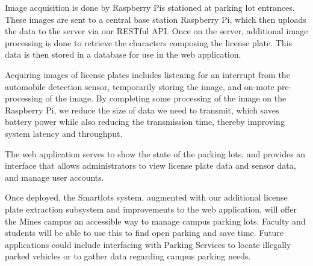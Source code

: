 \documentclass[11pt, oneside, fullpage, doublespace]{article}
\begin{document}
Image acquisition is done by Raspberry Pis stationed at parking lot entrances. These images are sent to a central base station Raspberry Pi, which then uploads the data to the server via our RESTful API. Once on the server, additional image processing is done to retrieve the characters composing the license plate. This data is then stored in a database for use in the web application.

Acquiring images of license plates includes listening for an interrupt from the automobile detection sensor, temporarily storing the image, and on-mote pre-processing of the image. By completing some processing of the image on the Raspberry Pi, we reduce the size of data we need to transmit, which saves battery power while also reducing the transmission time, thereby improving system latency and throughput.

The web application serves to show the state of the parking lots, and provides an interface that allows administrators to view license plate data and sensor data, and manage user accounts.

Once deployed, the Smartlots system, augmented with our additional license plate extraction subsystem and improvements to the web application, will offer the Mines campus an accessible way to manage campus parking lots. Faculty and students will be able to use this to find open parking and save time. Future applications could include interfacing with Parking Services to locate illegally parked vehicles or to gather data regarding campus parking needs.
\end{document}
